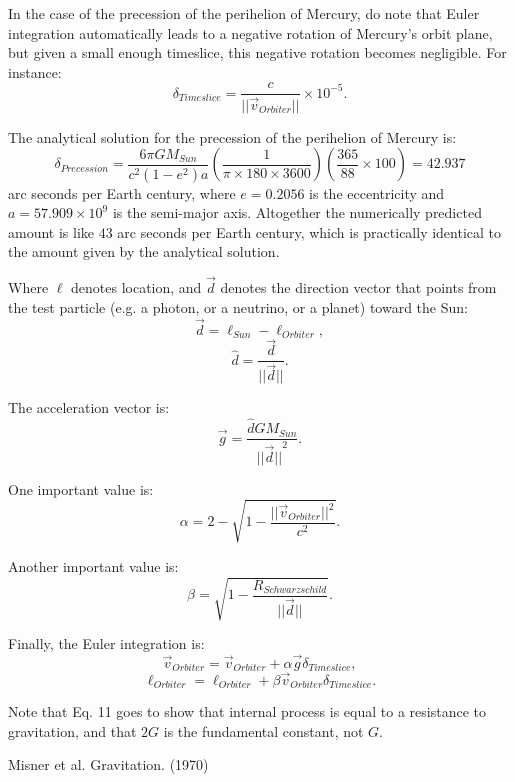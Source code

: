 \documentclass[12pt]{article}
\begin{document}
In the case of the precession of the perihelion of Mercury, do note that Euler integration automatically leads to a negative rotation of Mercury's orbit plane, but given a small enough timeslice, this negative rotation becomes negligible.
For instance:
\begin{equation}
\delta_{Timeslice} = \frac{c}{\lvert\lvert \vec{v}_{Orbiter} \rvert \rvert} \times 10^{-5}.
\end{equation}

The analytical solution for the precession of the perihelion of Mercury is:
\begin{equation}
\delta_{Precession} = \frac{6 \pi GM_{Sun}}{c^2 (1 - e^2) a} \left( \frac{1}{ \pi \times 180 \times 3600} \right) \left( \frac{365}{88} \times 100 \right) = 42.937
\end{equation}
arc seconds per Earth century, where $e = 0.2056$ is the eccentricity and $a = 57.909 \times 10^9$ is the semi-major axis.
Altogether the numerically predicted amount is like $43$ arc seconds per Earth century, which is practically identical to the amount given by the analytical solution.

Where $\ell$ denotes location, and $\vec{d}$ denotes the direction vector that points from the test particle (e.g. a photon, or a neutrino, or a planet) toward the Sun:
\begin{equation}
\vec{d} = \ell_{Sun} - \ell_{Orbiter},	
\end{equation}
\begin{equation}
\hat{d} = \frac{\vec{d}}{\lvert\lvert \vec{d} \rvert\rvert}.
\end{equation}

The acceleration vector is:
\begin{equation}
\vec{g} =  \frac{\hat{d} G M_{Sun}}{{\lvert\lvert \vec{d} \rvert\rvert}^2}.
\end{equation}

One important value is:
\begin{equation}
\alpha = 2 - \sqrt{1 - \frac{\lvert\lvert \vec{v}_{Orbiter}\rvert\rvert^2}{c^2}}.
\end{equation}

Another important value is:
\begin{equation}
\beta = \sqrt{1 - \frac{R_{Schwarzschild}}{\lvert \lvert \vec{d} \rvert \rvert}}.
\end{equation}

Finally, the Euler integration is:
\begin{equation}
\vec{v}_{Orbiter} = \vec{v}_{Orbiter} + \alpha \vec{g} \delta_{Timeslice},
\end{equation}
\begin{equation}
\ell_{Orbiter} = \ell_{Orbiter} + \beta \vec{v}_{Orbiter} \delta_{Timeslice}.
\end{equation}

Note that Eq. 11 goes to show that internal process is equal to a resistance to gravitation, and that $2G$ is the fundamental constant, not $G$.





\begin{thebibliography}{9}


 Misner et al. Gravitation. (1970)






\end{thebibliography}
\end{document}
